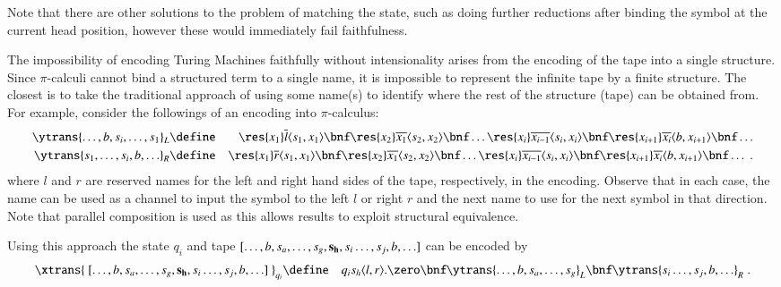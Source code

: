\documentclass[submission,copyright,creativecommons]{eptcs}
\newcommand{\tape}[1]{[#1]}
\begin{document}
Note that there are other solutions to the problem of matching the state, such as
doing further reductions after binding the symbol at the current head position,
however these would immediately fail faithfulness.


The impossibility of encoding Turing Machines faithfully without intensionality
arises from the encoding of the tape into a single structure.
Since $\pi$-calculi cannot bind a structured term to a single name, it is impossible
to represent the infinite tape by a finite structure.
The closest is to take the traditional approach of using some name(s) to identify
where the rest of the structure (tape) can be obtained from.
For example, consider the followings of an encoding into $\pi$-calculus:
\begin{eqnarray*}
\ytrans {\ldots,b,s_i,\ldots,s_1} _L &\define&
  \res {x_1} \overline{l} \langle s_1,x_1\rangle \bnf
  \res {x_2} \overline{x_1} \langle s_2,x_2\rangle \bnf
  \ldots
  \res {x_i} \overline{x_{i-1}} \langle s_i,x_i\rangle \bnf
  \res {x_{i+1}} \overline{x_i} \langle b,x_{i+1}\rangle \bnf \ldots\\
\ytrans {s_1,\ldots,s_i,b,\ldots} _R &\define&
  \res {x_1} \overline{r} \langle s_1,x_1\rangle \bnf
  \res {x_2} \overline{x_1} \langle s_2,x_2\rangle \bnf
  \ldots
  \res {x_i} \overline{x_{i-1}} \langle s_i,x_i\rangle \bnf
  \res {x_{i+1}} \overline{x_i} \langle b,x_{i+1}\rangle \bnf \ldots\; .
\end{eqnarray*}
where $l$ and $r$ are reserved names for the left and right hand sides of the tape, respectively,
in the encoding.
Observe that in each case, the name can be used as a channel to input the symbol to
the left $l$ or right $r$ and the next name to use for the next symbol in that direction.
Note that parallel composition is used as this allows results to exploit structural
equivalence.

Using this approach the state $q_i$ and tape
$\tape{\ldots,b,s_a,\ldots,s_g,{\bf s_h},s_i\ldots,s_j,b,\ldots}$ can be encoded by
\begin{eqnarray*}
\xtrans{\ \tape{\ldots,b,s_a,\ldots,s_g,{\bf s_h},s_i\ldots,s_j,b,\ldots}\ }_{q_i}
&\define& q_i s_h\langle l,r\rangle.\zero \bnf
\ytrans{\ldots,b,s_a,\ldots,s_g}_L\bnf
\ytrans {s_i\ldots,s_j,b,\ldots}_R\; .
\end{eqnarray*}
\end{document}
